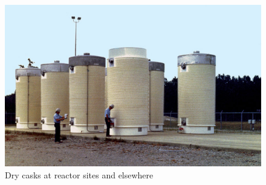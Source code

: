 \begin{figure}[htbp!]
\begin{center}
\begin{minipage}[t]{0.45\textwidth}
      \includegraphics[height=0.4\textheight]{./images/casks.eps}
      \caption{Dry casks at reactor sites and elsewhere \cite{nrc_dry_2008}}
        \label{fig:casks}
    \end{minipage}
    \end{center}
  \end{figure}
